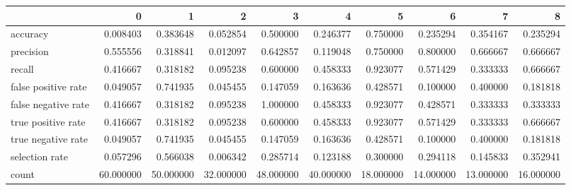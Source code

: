 \begin{tabular}{lrrrrrrrrr}
\toprule
{} &          0 &          1 &          2 &          3 &          4 &          5 &          6 &          7 &          8 \\
\midrule
accuracy            &   0.008403 &   0.383648 &   0.052854 &   0.500000 &   0.246377 &   0.750000 &   0.235294 &   0.354167 &   0.235294 \\
precision           &   0.555556 &   0.318841 &   0.012097 &   0.642857 &   0.119048 &   0.750000 &   0.800000 &   0.666667 &   0.666667 \\
recall              &   0.416667 &   0.318182 &   0.095238 &   0.600000 &   0.458333 &   0.923077 &   0.571429 &   0.333333 &   0.666667 \\
false positive rate &   0.049057 &   0.741935 &   0.045455 &   0.147059 &   0.163636 &   0.428571 &   0.100000 &   0.400000 &   0.181818 \\
false negative rate &   0.416667 &   0.318182 &   0.095238 &   1.000000 &   0.458333 &   0.923077 &   0.428571 &   0.333333 &   0.333333 \\
true positive rate  &   0.416667 &   0.318182 &   0.095238 &   0.600000 &   0.458333 &   0.923077 &   0.571429 &   0.333333 &   0.666667 \\
true negative rate  &   0.049057 &   0.741935 &   0.045455 &   0.147059 &   0.163636 &   0.428571 &   0.100000 &   0.400000 &   0.181818 \\
selection rate      &   0.057296 &   0.566038 &   0.006342 &   0.285714 &   0.123188 &   0.300000 &   0.294118 &   0.145833 &   0.352941 \\
count               &  60.000000 &  50.000000 &  32.000000 &  48.000000 &  40.000000 &  18.000000 &  14.000000 &  13.000000 &  16.000000 \\
\bottomrule
\end{tabular}
